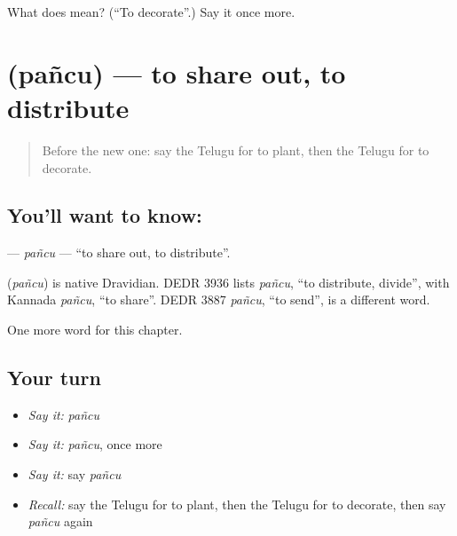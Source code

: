 \begin{tcolorbox}[breakable,colback=teal!4,colframe=teal!35!black,title={Before you move on}]
What does  mean? (\textquotedblleft{}To decorate\textquotedblright{}.) Say it once more.
\end{tcolorbox}
\section[\texorpdfstring{\te{పంచు} (pañcu)}{పంచు (pañcu)}]{ (pañcu) — to share out, to distribute}

\label{lesson:TE-C282-pancu}



\begin{quote}
Before the new one: say the Telugu for to plant, then the Telugu for to decorate.
\end{quote}

\subsection*{You'll want to know: }
\textbf{} — \emph{pañcu} — \textquotedblleft{}to share out, to distribute\textquotedblright{}.

\begin{cousinweb}
\textbf{} (\emph{pañcu}) is native Dravidian. DEDR 3936 lists \emph{pañcu}, \textquotedblleft{}to distribute, divide\textquotedblright{}, with Kannada \emph{pañcu}, \textquotedblleft{}to share\textquotedblright{}. DEDR 3887 \emph{pañcu}, \textquotedblleft{}to send\textquotedblright{}, is a different word.
\end{cousinweb}

\begin{grammarlens}[title={What you've built}]
One more word for this chapter.
\end{grammarlens}

\subsection*{Your turn}
\begin{itemize}
\raggedright
  \item \emph{Say it:} \emph{pañcu}
  \item \emph{Say it:} \emph{pañcu}, once more
  \item \emph{Say it:} say \emph{pañcu}
  \item \emph{Recall:} say the Telugu for to plant, then the Telugu for to decorate, then say \emph{pañcu} again
\end{itemize}

